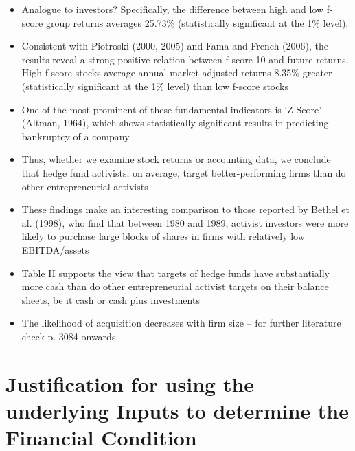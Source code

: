 \documentclass[12pt]{article}
\begin{document}
\begin{itemize}
        \item Analogue to investors? Specifically, the difference between high and low f-score group returns averages 25.73\% (statistically significant at the 1\% level). \citep{Choi2012}

        \item Consistent with Piotroski (2000, 2005) and Fama and French (2006), the results reveal a strong positive relation between f-score 10 and future returns. High f-score stocks average annual market-adjusted returns 8.35\% greater (statistically significant at the 1\% level) than low f-score stocks \citep{Choi2012} 

       \item One of the most prominent of these fundamental indicators is ‘Z-Score’ (Altman, 1964), which shows statistically significant results in predicting bankruptcy of a company \citep{Mohr2012}

       \item Thus, whether we examine stock returns or accounting data, we conclude that hedge fund activists, on average, target better-performing firms than do other entrepreneurial activists \citep{Klein2009}

       \item These findings make an interesting comparison to those reported by Bethel et al. (1998), who find that between 1980 and 1989, activist investors were more likely to purchase large blocks of shares in firms with relatively low EBITDA/assets \citep{Klein2009}

       \item Table II supports the view that targets of hedge funds have substantially more cash than do other entrepreneurial activist targets on their balance sheets, be it cash or cash plus investments \citep{Klein2009}

       \item The likelihood of acquisition decreases with firm size \citep{Akhigbe2007} -- for further literature check p. 3084 onwards.
    \end{itemize}


\section{Justification for using the underlying Inputs to determine the Financial Condition}
\end{document}
